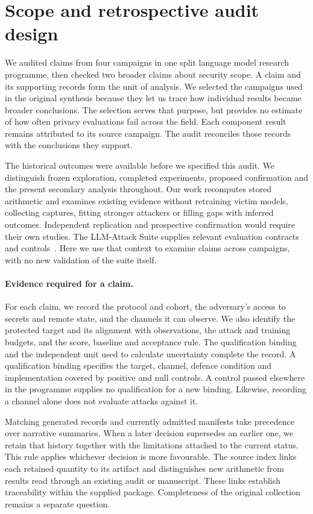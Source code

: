 \section{Scope and retrospective audit design}
\label{sec:design}

We audited claims from four campaigns in one split language model research
programme, then checked two broader claims about security scope. A claim
and its supporting records form the unit of analysis. We selected the
campaigns used in the original synthesis because they let us trace how
individual results became broader conclusions. The selection serves that
purpose, but provides no estimate of how often privacy evaluations fail
across the field. Each component result remains attributed to its source
campaign. The audit reconciles those records with the conclusions they
support.

The historical outcomes were available before we specified this audit.
We distinguish frozen exploration, completed experiments, proposed
confirmation and the present secondary analysis throughout. Our work
recomputes stored arithmetic and examines existing evidence without
retraining victim models, collecting captures, fitting stronger attackers
or filling gaps with inferred outcomes. Independent replication and
prospective confirmation would require their own studies. The
LLM-Attack Suite supplies relevant evaluation contracts and
controls~\citep{suite2026}. Here we use that context to examine claims
across campaigns, with no new validation of the suite itself.

\paragraph{Evidence required for a claim.}
For each claim, we record the protocol and cohort, the adversary's access
to secrets and remote state, and the channels it can observe. We also
identify the protected target and its alignment with observations, the
attack and training budgets, and the score, baseline and acceptance rule.
The qualification binding and the independent unit used to calculate
uncertainty complete the record. A qualification binding specifies the
target, channel, defence condition and implementation covered by positive
and null controls. A control passed elsewhere in the programme supplies
no qualification for a new binding. Likewise, recording a channel alone
does not evaluate attacks against it.

Matching generated records and currently admitted manifests take
precedence over narrative summaries. When a later decision supersedes an
earlier one, we retain that history together with the limitations attached
to the current status. This rule applies whichever decision is more
favourable. The source index links each retained quantity to its artifact
and distinguishes new arithmetic from results read through an existing
audit or manuscript. These links establish traceability within the supplied
package. Completeness of the original collection remains a separate
question.

